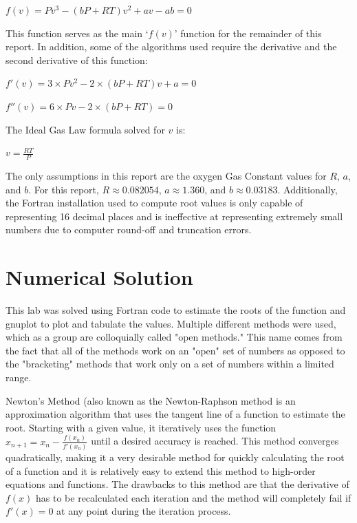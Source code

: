 \documentclass[12pt, letterpaper]{article}
\begin{document}
		\begin{center}
			$f(v)=Pv^3-(bP+RT)v^2+av-ab=0$
		\end{center}
	
	This function serves as the main `$f(v)$' function for the remainder of this report. In addition, some of the algorithms used require the derivative and the second derivative of this function:
	
		\begin{center}
			$f'(v) = 3\times Pv^2-2\times (bP+RT)v+a=0$
		\end{center}
		
		\begin{center}
			$f''(v) = 6\times Pv-2\times (bP+RT)=0$
		\end{center}

	
	The Ideal Gas Law formula solved for $v$ is:

		\begin{center}
			$v=\frac{RT}{P}$
		\end{center}

	The only assumptions in this report are the oxygen Gas Constant values for $R$, $a$, and $b$. For this report, $R\approx0.082054$, $a\approx1.360$, and $b\approx0.03183$. Additionally, the Fortran installation used to compute root values is only capable of representing 16 decimal places and is ineffective at representing extremely small numbers due to computer round-off and truncation errors.

\section{Numerical Solution}
	This lab was solved using Fortran code to estimate the roots of the function and gnuplot to plot and tabulate the values. Multiple different methods were used, which as a group are colloquially called "open methods." This name comes from the fact that all of the methods work on an "open" set of numbers as opposed to the "bracketing" methods that work only on a set of numbers within a limited range.
	
	Newton's Method (also known as the Newton-Raphson method is an approximation algorithm that uses the tangent line of a function to estimate the root. Starting with a given value, it iteratively uses the function $x_{n+1}=x_n-\frac{f(x_n)}{f'(x_n)}$ until a desired accuracy is reached. This method converges quadratically, making it a very desirable method for quickly calculating the root of a function and it is relatively easy to extend this method to high-order equations and functions. The drawbacks to this method are that the derivative of $f(x)$ has to be recalculated each iteration and the method will completely fail if $f'(x)=0$ at any point during the iteration process.
	
\end{document}
